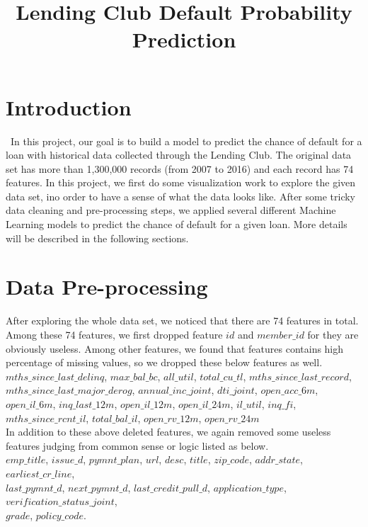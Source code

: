 \documentclass[12pt]{article}
\title{Lending Club Default Probability Prediction}
\begin{document}
%
\maketitle

\section{Introduction}
\quad\ In this project, our goal is to build a model to predict the chance of default for a loan with historical data collected through the Lending Club. The original data set has more than 1,300,000 records (from 2007 to 2016) and each record has 74 features. In this project, we first do some visualization work to explore the given data set, ino order to have a sense of what the data looks like. After some tricky data cleaning and pre-processing steps, we applied several different Machine Learning models to predict the chance of default for a given loan. More details will be described in the following sections.

\section{Data Pre-processing}
\quad After exploring the whole data set, we noticed that there are 74 features in total. Among these 74 features, we first dropped feature $id$ and $member\_id$ for they are obviously useless. Among other features, we found that features contains high percentage of missing values, so we dropped these below features as well.\\ 

$mths\_since\_last\_delinq$, $ max\_bal\_bc $, $ all\_util $, $ total\_cu\_tl $, $ mths\_since\_last\_record$, \\$ mths\_since\_last\_major\_derog $, $ annual\_inc\_joint $, $ dti\_joint $, $ open\_acc\_6m $, $ open\_il\_6m $, $ inq\_last\_12m $, $ open\_il\_12m $, $ open\_il\_24m $, $ il\_util $, $ inq\_fi $, \\$ mths\_since\_rcnt\_il $, $ total\_bal\_il $, $ open\_rv\_12m $, $ open\_rv\_24m $ \\


In addition to these above deleted features, we again removed some useless features judging from common sense or logic listed as below.\\

$emp\_title$, $issue\_d$, $pymnt\_plan$, $url$, $desc$, $title$, $zip\_code$, $addr\_state$, $earliest\_cr\_line$, \\$last\_pymnt\_d$, $next\_pymnt\_d$, $last\_credit\_pull\_d$, $application\_type$, $verification\_status\_joint$, \\$grade$, $policy\_code$.\\ 
\end{document}
